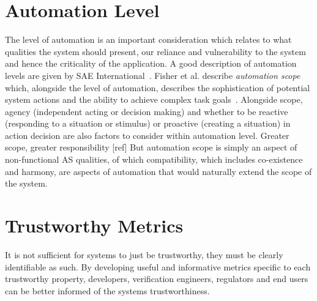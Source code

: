 \section{Automation Level} \label{sec:autlev}

The level of automation is an important consideration which relates to what qualities the system should present, our reliance and vulnerability to the system and hence the criticality of the application. A good description of automation levels are given by SAE International~\cite{SAEJ3016}. 
%
Fisher et al. describe \emph{automation scope} which, alongside the level of automation, describes the sophistication of potential system actions and the ability to achieve complex task goals~\cite{Fisher2021}. 
%
Alongside scope, agency (independent acting or decision making) and whether to be reactive (responding to a situation or stimulus) or proactive (creating a situation) in action decision are also factors to consider within automation level.
%
Greater scope, greater responsibility [ref]
%
%
But automation scope is simply an aspect of non-functional AS qualities, of which compatibility, which includes co-existence and harmony, are aspects of automation that would naturally extend the scope of the system. 



\section{Trustworthy Metrics}

It is not sufficient for systems to just be trustworthy, they must be clearly identifiable as such. By developing useful and informative metrics specific to each trustworthy property, developers, verification engineers, regulators and end users can be better informed of the systems trustworthiness.

